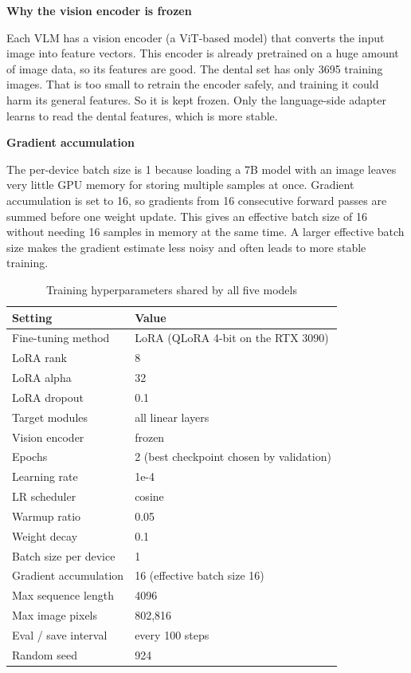 \documentclass[a4paper,12pt]{report}
\newcommand{\minisection}[1]{%
  \vspace{1ex}
  \noindent\textbf{#1}\par
  \vspace{0.5ex}
}
\begin{document}
\minisection{Why the vision encoder is frozen}

Each VLM has a vision encoder (a ViT-based model) that converts the input image into feature vectors. This encoder is already pretrained on a huge amount of image data, so its features are good. The dental set has only 3695 training images. That is too small to retrain the encoder safely, and training it could harm its general features. So it is kept frozen. Only the language-side adapter learns to read the dental features, which is more stable.

\minisection{Gradient accumulation}

The per-device batch size is 1 because loading a 7B model with an image leaves very little GPU memory for storing multiple samples at once. Gradient accumulation is set to 16, so gradients from 16 consecutive forward passes are summed before one weight update. This gives an effective batch size of 16 without needing 16 samples in memory at the same time. A larger effective batch size makes the gradient estimate less noisy and often leads to more stable training.

\begin{table}[H]
\centering
\caption{Training hyperparameters shared by all five models}
\begin{tabular}{ll}
\toprule
Setting & Value \\
\midrule
Fine-tuning method      & LoRA (QLoRA 4-bit on the RTX 3090) \\
LoRA rank               & 8 \\
LoRA alpha              & 32 \\
LoRA dropout            & 0.1 \\
Target modules          & all linear layers \\
Vision encoder          & frozen \\
Epochs                  & 2 (best checkpoint chosen by validation) \\
Learning rate           & 1e-4 \\
LR scheduler            & cosine \\
Warmup ratio            & 0.05 \\
Weight decay            & 0.1 \\
Batch size per device   & 1 \\
Gradient accumulation   & 16 (effective batch size 16) \\
Max sequence length     & 4096 \\
Max image pixels        & 802{,}816 \\
Eval / save interval    & every 100 steps \\
Random seed             & 924 \\
\bottomrule
\end{tabular}
\end{table}
\end{document}
